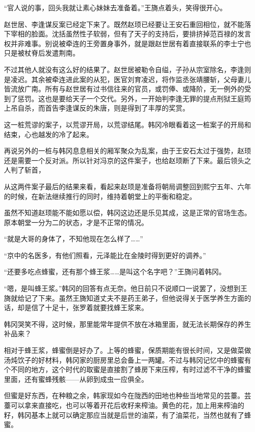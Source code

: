 “官人说的事，回头我就让素心妹妹去准备着。”王旖点着头，笑得很开心。

赵世居、李逢谋反案已经定下来了。既然赵顼已经要让王安石重回相位，就不能落下宰相的脸面。沈括虽然性子软弱，但有了天子的支持后，要排挤掉范百禄的发言权并非难事。别说被牵连的王旁置身事外，就是跟赵世居有着直接联系的李士宁也只是被杖脊后发遣荆南。

不过其他人就没有这么好的结果了。赵世居被勒令自缢，子孙从宗室除名，李逢则是凌迟。其余被牵连进此案的从犯，医官刘育凌迟，将作监丞张靖腰斩，父母妻儿皆流放广南。所有与赵世居有过书信往来的官员，或罚俸、或降阶，无一例外的受到了惩罚。这也是要给天子一个交代。另外，一开始判李逢无罪的提点刑狱王庭筠上吊自杀，而首告李逢谋反的朱唐，则是得到了丰厚的奖赏。

这一桩荒谬的案子，以荒谬开局，以荒谬结尾。韩冈冷眼看着这一桩案子的开局和结束，心也越发的冷了起来。

再说另外的一桩与韩冈息息相关的厢军聚众为乱案，由于王安石太过于强势，赵顼还是需要一个反对派。所以针对冯京的这件案子，也给赵顼断了下来。最后领头之人判了斩首，

从这两件案子最后的结果来看，看起来赵顼是准备将朝局调整回到熙宁五年、六年的时候，在新法继续推行的同时，维持着朝堂上的平衡和稳定。

虽然不知道赵顼能不能如愿以偿，韩冈这边还是乐见其成，这是正常的官场生态。原本朝堂一分为二的状态，才是不正常的情况。

“就是大哥的身体了，不知他现在怎么样了……”

“京中的名医多，有他们照看，元泽能比在金陵时得到更好的调养。”

“还要多吃点蜂蜜，还有那个蜂王浆……是叫这个名字吧？”王旖问着韩冈。

“嗯，是叫蜂王浆。”韩冈的回答有点无奈。他日前只不说顺口一说罢了，没想到王旖就给记了下来。虽然王旖知道丈夫不是药王弟子，但他说得关于医学养生方面的话，却是信了十足十，张罗着就要找蜂王浆来。

韩冈哭笑不得，这时候，那里能常年提供不放在冰箱里面，就无法长期保存的养生补品来？

相对于蜂王浆，蜂蜜倒是好办了。上等的蜂蜜，保质期能有很长时间，又是做菜做汤炖饮子的好材料，韩冈家的厨房里总会备上一两罐。不过与韩冈记忆中的蜂蜜有个不同的地方，这个时代的取蜜是直接割了蜂房下来压榨，有时过滤不干净的蜂蜜里面，还有蜜蜂残骸——从卵到成虫一应俱全。

但蜜是好东西，在种粮之余，韩家现如今在陇西的田地也种些当地常见的芸薹。芸薹可以拿来直接吃，也可以等着开花后收籽来榨油。黄色的花，加上用来榨油的籽，韩冈基本上就可以确定那应当就是后世的油菜，有了油菜花，当然也就有了蜂蜜。

